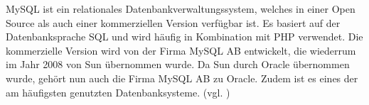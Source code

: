 MySQL ist ein relationales Datenbankverwaltungssystem, welches in einer Open Source als auch einer kommerziellen Version verfügbar ist. Es basiert auf der Datenbanksprache \ac{SQL} und wird häufig in Kombination mit \ac{PHP} verwendet. Die kommerzielle Version wird von der Firma MySQL AB entwickelt, die wiederrum im Jahr 2008 von Sun übernommen wurde. Da Sun durch Oracle übernommen wurde, gehört nun auch die Firma MySQL AB zu Oracle.  Zudem ist es eines der am häufigsten genutzten Datenbanksysteme. (vgl. \cite{.q}\cite{Horn.12.03.2017})
